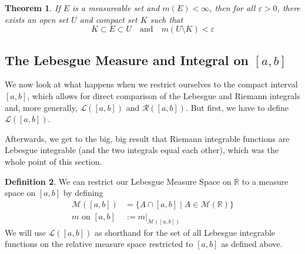 \documentclass[12pt]{article}
\theoremstyle{plain}
\newtheorem{thm}{Theorem}[subsection]
\theoremstyle{definition}
\newtheorem{defn}[thm]{Definition}
\theoremstyle{remark}
\begin{document}
\begin{thm}
If $E$ is a measureable set and $m(E)<\infty$, then for all $\varepsilon>0$, there exists an open set $U$ and compact set $K$ such that
\[
    K\subset E\subset U
    \quad \text{and} \quad
    m(U\setminus K)<\varepsilon
\]
\end{thm}


\newpage
\subsection{The Lebesgue Measure and Integral on $[a,b]$ \label{sec.support2}}

We now look at what happens when we restrict ourselves to the compact interval $[a,b]$, which allows for direct comparison of the Lebesgue and Riemann integrals and, more generally, $\mathscr{L}([a,b])$ and $\mathscr{R}([a,b])$. But first, we have to define $\mathscr{L}([a,b])$.

Afterwards, we get to the big, big result that Riemann integrable functions are Lebesgue integrable (and the two integrals equal each other), which was the whole point of this section.

\begin{defn}
We can restrict our Lebesgue Measure Space on $\mathbb{R}$ to a measure space on $[a,b]$ by defining
\begin{align*}
    \mathscr{M}([a,b]) &= \{A\cap[a,b] \; | \;
        A\in\mathscr{M}(\mathbb{R})\} \\
    m \text{ on $[a,b]$} &:= 
        m|_{\mathscr{M}([a,b])}
\end{align*}
We will use $\mathscr{L}([a,b])$ as shorthand for the set of all Lebesgue integrable functions on the relative measure space restricted to $[a,b]$ as defined above.
\end{defn}
\end{document}
